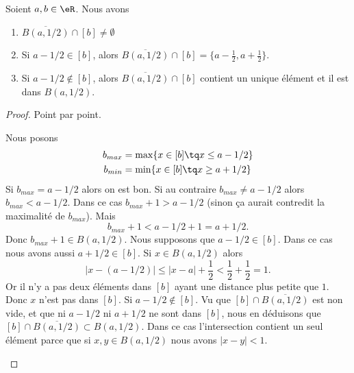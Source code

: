 \begin{lemma}	\label{LEMooJRQZooLCXOWQ}
	Soient \( a,b\in \eR\). Nous avons
	\begin{enumerate}
		\item		\label{ITEMooBDAQooSYWkMX}
		      \( \overline{B(a,1/2)}\cap[b]\neq \emptyset\)
		\item		\label{ITEMooRSAKooLzvllq}
		      Si \( a-1/2\in[b]\), alors \( \overline{B(a,1/2)}\cap[b]=\{ a-\frac{ 1 }{2},a+\frac{ 1 }{2} \}\).
		\item		\label{ITEMooANPJooAdrPTK}
		      Si \( a-1/2\not\in[b]\), alors \( \overline{B(a,1/2)}\cap[b]\) contient un unique élément et il est dans \( B(a,1/2)\).
	\end{enumerate}
\end{lemma}

\begin{proof}
	Point par point.
	\begin{subproof}
		Nous posons
		\begin{subequations}
			\begin{align}
				b_{max} & =\max\{ x\in[b]\tq x\leq a-1/2 \} \\
				b_{min} & =\min\{ x\in[b]\tq x\geq a+1/2 \}
			\end{align}
		\end{subequations}
		Si \( b_{max}=a-1/2\) alors on est bon. Si au contraire \( b_{max}\neq a-1/2\) alors \( b_{max}<a-1/2\). Dans ce cas \( b_{max}+1>a-1/2\) (sinon ça aurait contredit la maximalité de \( b_{max}\)). Mais
		\begin{equation}
			b_{max}+1<a-1/2+1=a+1/2.
		\end{equation}
		Donc \( b_{max}+1\in B(a,1/2)\).
		Nous supposons que \( a-1/2\in[b]\). Dans ce cas nous avons aussi \( a+1/2\in[b]\). Si \( x\in B(a,1/2)\) alors
		\begin{equation}
			| x-(a-1/2) |\leq | x-a |+\frac{ 1 }{2}<\frac{ 1 }{2}+\frac{ 1 }{2}=1.
		\end{equation}
		Or il n'y a pas deux éléments dans \( [b]\) ayant une distance plus petite que \( 1\). Donc \( x\) n'est pas dans \( [b]\).
		Si \( a-1/2\not\in [b]\). Vu que \( [b]\cap \overline{B(a,1/2)}\) est non vide, et que ni \( a-1/2\) ni \( a+1/2\) ne sont dans \( [b]\), nous en déduisons que \( [b]\cap \overline{B(a,1/2)}\subset B(a,1/2) \). Dans ce cas l'intersection contient un seul élément parce que si \( x,y\in B(a,1/2)\) nous avons \( | x-y |<1\).
	\end{subproof}
\end{proof}

